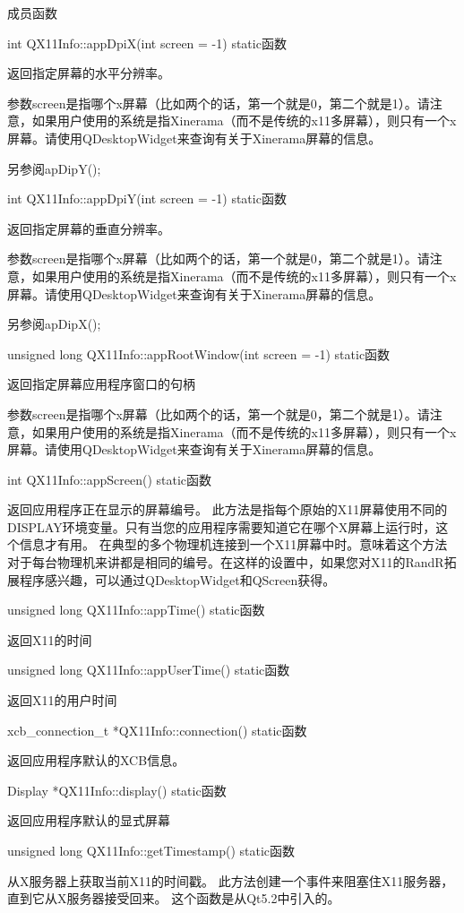 成员函数

int QX11Info::appDpiX(int screen = -1) static函数

返回指定屏幕的水平分辨率。

参数screen是指哪个x屏幕（比如两个的话，第一个就是0，第二个就是1）。请注意，如果用户使用的系统是指Xinerama（而不是传统的x11多屏幕），则只有一个x屏幕。请使用QDesktopWidget来查询有关于Xinerama屏幕的信息。

另参阅apDipY();

int QX11Info::appDpiY(int screen = -1) static函数

返回指定屏幕的垂直分辨率。

参数screen是指哪个x屏幕（比如两个的话，第一个就是0，第二个就是1）。请注意，如果用户使用的系统是指Xinerama（而不是传统的x11多屏幕），则只有一个x屏幕。请使用QDesktopWidget来查询有关于Xinerama屏幕的信息。

另参阅apDipX();

unsigned long QX11Info::appRootWindow(int screen = -1) static函数

返回指定屏幕应用程序窗口的句柄

参数screen是指哪个x屏幕（比如两个的话，第一个就是0，第二个就是1）。请注意，如果用户使用的系统是指Xinerama（而不是传统的x11多屏幕），则只有一个x屏幕。请使用QDesktopWidget来查询有关于Xinerama屏幕的信息。

int QX11Info::appScreen() static函数

返回应用程序正在显示的屏幕编号。 此方法是指每个原始的X11屏幕使用不同的DISPLAY环境变量。只有当您的应用程序需要知道它在哪个X屏幕上运行时，这个信息才有用。 在典型的多个物理机连接到一个X11屏幕中时。意味着这个方法对于每台物理机来讲都是相同的编号。在这样的设置中，如果您对X11的RandR拓展程序感兴趣，可以通过QDesktopWidget和QScreen获得。

unsigned long QX11Info::appTime() static函数

返回X11的时间

unsigned long QX11Info::appUserTime() static函数

返回X11的用户时间

xcb\_connection\_t *QX11Info::connection() static函数

返回应用程序默认的XCB信息。

Display *QX11Info::display() static函数

返回应用程序默认的显式屏幕

unsigned long QX11Info::getTimestamp() static函数

从X服务器上获取当前X11的时间戳。 此方法创建一个事件来阻塞住X11服务器，直到它从X服务器接受回来。 这个函数是从Qt5.2中引入的。

